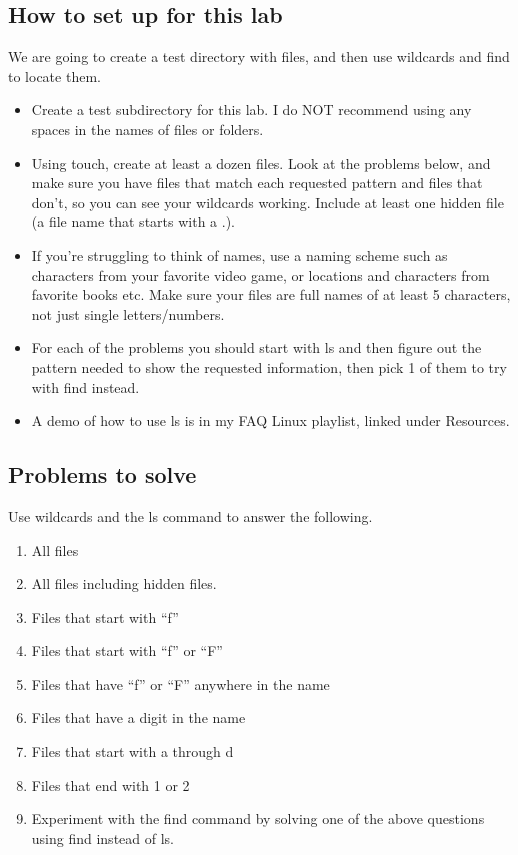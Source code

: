 \documentclass[12pt]{article}
\begin{document}
\subsection*{How to set up for this lab}
We are going to create a test directory with files, and then use wildcards and find to locate them.
\begin{itemize}
    \item Create a test subdirectory for this lab. I do NOT recommend using any spaces in the names of files or folders.
    \item Using touch, create at least a dozen files. Look at the problems below, and make sure you have files that match each requested pattern and files that don't, so you can see your wildcards working. Include at least one hidden file (a file name that starts with a .).
    \item If you're struggling to think of names, use a naming scheme such as characters from your favorite video game, or locations and characters from favorite books etc.  Make sure your files are full names of at least 5 characters, not just single letters/numbers.
    \item For each of the problems you should start with ls and then figure out the pattern needed to show the requested information, then pick 1 of them to try with find instead.
    \item A demo of how to use ls is in my FAQ Linux playlist, linked under Resources.
\end{itemize}
\subsection*{Problems to solve}
Use wildcards and the ls command to answer the following. 
    \begin{enumerate}
        \item All files
        \item All files including hidden files.
        \item Files that start with “f”
        \item Files that start with “f” or “F”
        \item Files that have “f” or “F” anywhere in the name
        \item Files that have a digit in the name
        \item Files that start with a through d
        \item Files that end with 1 or 2
        \item Experiment with the find command by solving one of the above questions using find instead of ls.

    \end{enumerate}
\end{document}
